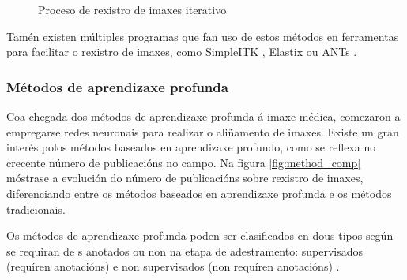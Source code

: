 \begin{figure}[tbp]
\centering
{}
\caption{Proceso de rexistro de imaxes iterativo}
\label{fig:rexistro_iterativo}
\end{figure}

Tamén existen múltiples programas que fan uso de estos métodos en ferramentas para facilitar o rexistro de imaxes, como SimpleITK \cite{simpleitk}, Elastix \cite{elastix} ou ANTs \cite{ants}.

\subsubsection{Métodos de aprendizaxe profunda}
\label{subsubsec:Métodos de aprendizaxe profunda}

Coa chegada dos métodos de aprendizaxe profunda á imaxe médica, comezaron a empregarse redes neuronais para realizar o aliñamento de imaxes.
Existe un gran interés polos métodos baseados en aprendizaxe profundo, como se reflexa no crecente número de publicacións no campo. Na figura \ref{fig:method_comp} móstrase a evolución do número de publicacións sobre rexistro de imaxes, diferenciando entre os métodos baseados en aprendizaxe profunda e os métodos tradicionais.

Os métodos de aprendizaxe profunda poden ser clasificados en dous tipos según se requiran de s anotados ou non na etapa de adestramento:
supervisados (requíren anotacións) e non supervisados (non requíren anotacións) \cite{nie2024medicalimageregistrationapplication}.

